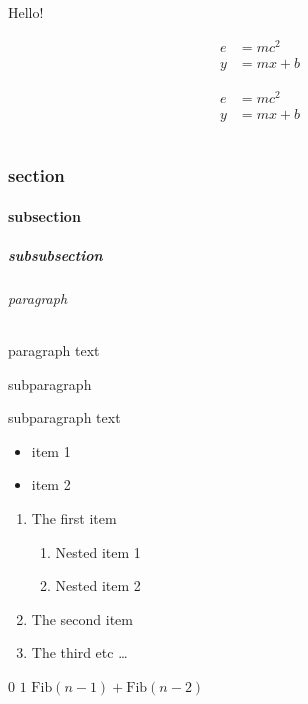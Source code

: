 \documentclass{article}
\begin{document}
Hello!

\begin{align}
e&=mc^2\\
y&=mx+b
\end{align}

\begin{align*}
e&=mc^2\\
y&=mx+b
\end{align*}

\part{}
\section{section}
\subsection{subsection}
\subsubsection{subsubsection}
\paragraph{paragraph} paragraph text
\subparagraph{subparagraph} subparagraph text
\newline

\hfill \break

\begin{itemize}
    \item item 1
    \item item 2
\end{itemize}

\hfill \break

\begin{enumerate}
\item The first item
\begin{enumerate}
\item Nested item 1
\item Nested item 2
\end{enumerate}
\item The second item
\item The third etc \ldots
\end{enumerate}

\begin{minipage}{\linewidth}
\begin{algorithm}[H]
    \begin{algorithmic}[1]
                \State \Return $0$
            \EndIf
                \State \Return $1$
            \EndIf
            \State \Return $\text{Fib}(n-1) + \text{Fib}(n-2)$
        \EndFunction
    \end{algorithmic}
\end{algorithm}
\end{minipage}
\end{document}
